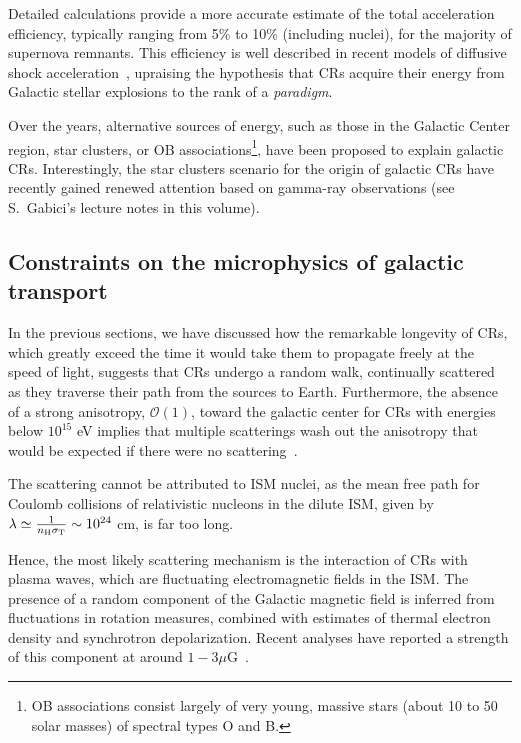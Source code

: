 Detailed calculations provide a more accurate estimate of the total acceleration efficiency, typically ranging from 5\% to 10\% (including nuclei), for the majority of supernova remnants. This efficiency is well described in recent models of diffusive shock acceleration~\cite{Morlino2017hsn}, upraising the hypothesis that CRs acquire their energy from Galactic stellar explosions to the rank of a \emph{paradigm}.

Over the years, alternative sources of energy, such as those in the Galactic Center region, star clusters, or OB associations\footnote{OB associations consist largely of very young, massive stars (about 10 to 50 solar masses) of spectral types O and B.}, have been proposed to explain galactic CRs. 
%
Interestingly, the star clusters scenario for the origin of galactic CRs have recently gained renewed attention based on gamma-ray observations (see S.~Gabici's lecture notes in this volume).


\subsection{Constraints on the microphysics of galactic transport}

In the previous sections, we have discussed how the remarkable longevity of CRs, which greatly exceed the time it would take them to propagate freely at the speed of light, suggests that CRs undergo a random walk, continually scattered as they traverse their path from the sources to Earth.
%
Furthermore, the absence of a strong anisotropy, $\mathcal{O}(1)$, toward the galactic center for CRs with energies below $10^{15}$ eV implies that multiple scatterings wash out the anisotropy that would be expected if there were no scattering~\cite{Hillas2005jpg}. 

The scattering cannot be attributed to ISM nuclei, as the mean free path for Coulomb collisions of relativistic nucleons in the dilute ISM, given by $\lambda \simeq \frac{1}{n_{\rm H} \sigma_{\rm T}} \sim 10^{24}$ cm, is far too long.

Hence, the most likely scattering mechanism is the interaction of CRs with plasma waves, which are fluctuating electromagnetic fields in the ISM. The presence of a random component of the Galactic magnetic field is inferred from fluctuations in rotation measures, combined with estimates of thermal electron density and synchrotron depolarization. Recent analyses have reported a strength of this component at around $1-3 \mu$G~\cite{Ferriere2023epj}.


